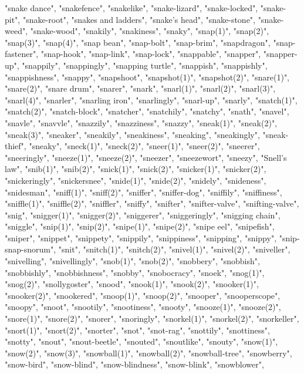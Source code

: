"snake dance",
"snakefence",
"snakelike",
"snake-lizard",
"snake-locked",
"snake-pit",
"snake-root",
"snakes and ladders",
"snake's head",
"snake-stone",
"snake-weed",
"snake-wood",
"snakily",
"snakiness",
"snaky",
"snap(1)",
"snap(2)",
"snap(3)",
"snap(4)",
"snap bean",
"snap-bolt",
"snap-brim",
"snapdragon",
"snap-fastener",
"snap-hook",
"snap-link",
"snap-lock",
"snappable",
"snapper",
"snapper-up",
"snappily",
"snappingly",
"snapping turtle",
"snappish",
"snappishly",
"snappishness",
"snappy",
"snapshoot",
"snapshot(1)",
"snapshot(2)",
"snare(1)",
"snare(2)",
"snare drum",
"snarer",
"snark",
"snarl(1)",
"snarl(2)",
"snarl(3)",
"snarl(4)",
"snarler",
"snarling iron",
"snarlingly",
"snarl-up",
"snarly",
"snatch(1)",
"snatch(2)",
"snatch-block",
"snatcher",
"snatchily",
"snatchy",
"snath",
"snavel",
"snavle",
"snavvle",
"snazzily",
"snazziness",
"snazzy",
"sneak(1)",
"sneak(2)",
"sneak(3)",
"sneaker",
"sneakily",
"sneakiness",
"sneaking",
"sneakingly",
"sneak-thief",
"sneaky",
"sneck(1)",
"sneck(2)",
"sneer(1)",
"sneer(2)",
"sneerer",
"sneeringly",
"sneeze(1)",
"sneeze(2)",
"sneezer",
"sneezewort",
"sneezy",
"Snell's law",
"snib(1)",
"snib(2)",
"snick(1)",
"snick(2)",
"snicker(1)",
"snicker(2)",
"snickeringly",
"snickersnee",
"snide(1)",
"snide(2)",
"snidely",
"snideness",
"snidesman",
"sniff(1)",
"sniff(2)",
"sniffer",
"sniffer-dog",
"sniffily",
"sniffiness",
"sniffle(1)",
"sniffle(2)",
"sniffler",
"sniffy",
"snifter",
"snifter-valve",
"snifting-valve",
"snig",
"snigger(1)",
"snigger(2)",
"sniggerer",
"sniggeringly",
"snigging chain",
"sniggle",
"snip(1)",
"snip(2)",
"snipe(1)",
"snipe(2)",
"snipe eel",
"snipefish",
"sniper",
"snippet",
"snippety",
"snippily",
"snippiness",
"snipping",
"snippy",
"snip-snap-snorum",
"snit",
"snitch(1)",
"snitch(2)",
"snivel(1)",
"snivel(2)",
"sniveller",
"snivelling",
"snivellingly",
"snob(1)",
"snob(2)",
"snobbery",
"snobbish",
"snobbishly",
"snobbishness",
"snobby",
"snobocracy",
"snoek",
"snog(1)",
"snog(2)",
"snollygoster",
"snood",
"snook(1)",
"snook(2)",
"snooker(1)",
"snooker(2)",
"snookered",
"snoop(1)",
"snoop(2)",
"snooper",
"snooperscope",
"snoopy",
"snoot",
"snootily",
"snootiness",
"snooty",
"snooze(1)",
"snooze(2)",
"snore(1)",
"snore(2)",
"snorer",
"snoringly",
"snorkel(1)",
"snorkel(2)",
"snorkeller",
"snort(1)",
"snort(2)",
"snorter",
"snot",
"snot-rag",
"snottily",
"snottiness",
"snotty",
"snout",
"snout-beetle",
"snouted",
"snoutlike",
"snouty",
"snow(1)",
"snow(2)",
"snow(3)",
"snowball(1)",
"snowball(2)",
"snowball-tree",
"snowberry",
"snow-bird",
"snow-blind",
"snow-blindness",
"snow-blink",
"snowblower",
